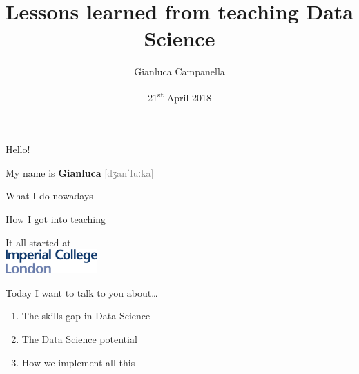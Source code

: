 \documentclass[12pt,aspectratio=169]{beamer}
\title{Lessons learned from teaching Data Science}
\author{Gianluca Campanella}
\date{21\textsuperscript{st} April 2018}
\begin{document}
\maketitle

\begin{frame}{Hello!}
    \begin{center}
        \LARGE%
        My name is \textbf{Gianluca}
        {\textcolor{gray}{[dʒanˈluːka]}}
    \end{center}
\end{frame}

\begin{frame}{What I do nowadays}
    \LARGE%
\end{frame}

\begin{frame}{How I got into teaching}
    \LARGE%
    \begin{center}
        It all started at \\[\bigskipamount]
        \includegraphics[height=2.5em]{figures/icl}
    \end{center}
\end{frame}

\begin{frame}{Today I want to talk to you about\ldots}
    \LARGE%
    \begin{enumerate}
        \setlength{\itemsep}{\bigskipamount}
        \item The skills gap in Data Science
        \item The Data Science potential
        \item How we implement all this
    \end{enumerate}
\end{frame}
\end{document}
